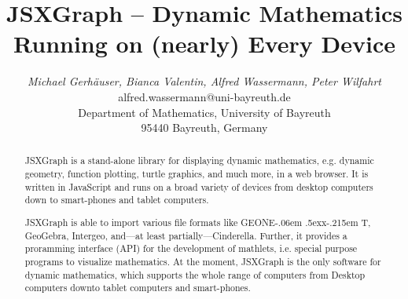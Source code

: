 \documentclass[12pt,a4paper]{article}%
\def\GEONExT{GEONE\kern-.06em \lower.5ex\hbox{x}\kern-.215em T}
\begin{document}
%
%
\title{JSXGraph -- Dynamic Mathematics Running on (nearly) Every Device}%
%
%
\author{\begin{tabular}{c}
\textit{Michael Gerh\"auser, Bianca Valentin, Alfred Wassermann, Peter Wilfahrt} \\
alfred.wassermann@uni-bayreuth.de\\
Department of Mathematics, 
University of Bayreuth\\
95440 Bayreuth, 
Germany\end{tabular}
}%
%
\date{}                                                   %
\maketitle                                                %
%
%
\begin{abstract}
%
JSXGraph is a stand-alone library for displaying dynamic mathematics, e.g. dynamic geometry, 
function plotting, turtle graphics, and much more, in a web browser. 
It is written in JavaScript and runs on a broad variety of devices from 
desktop computers down to smart-phones and tablet computers. 

JSXGraph is able to import various file formats like \GEONExT{}, GeoGebra, Intergeo, 
and---at least partially---Cinderella. Further, it provides a proramming
interface (API) for the development of mathlets, i.e. special
purpose programs to visualize mathematics.
At the moment, JSXGraph is the only software for dynamic mathematics, which
supports the whole range of computers from Desktop computers
downto tablet computers and smart-phones.
%
\end{abstract}%
%
\thispagestyle{fancy}                                     %
%
%
\end{document}
